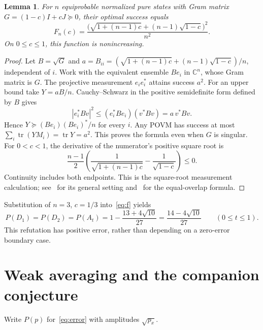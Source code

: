 \documentclass[11pt]{article}
\newtheorem{lemma}[theorem]{Lemma}
\newcommand{\tr}{\operatorname{tr}}
\begin{document}
\begin{lemma}\label{lem:symmetric}
For $n$ equiprobable normalized pure states with Gram matrix
$G=(1-c)I+cJ\succeq0$, their optimal success equals
\begin{equation}\label{eq:f}
 F_n(c)=\frac{\bigl(\sqrt{1+(n-1)c}+(n-1)\sqrt{1-c}\bigr)^2}{n^2}.
\end{equation}
On $0\leq c\leq1$, this function is nonincreasing.
\end{lemma}
\begin{proof}
Let $B=\sqrt G$ and
$a=B_{ii}=(\sqrt{1+(n-1)c}+(n-1)\sqrt{1-c})/n$,
independent of $i$. Work with the equivalent ensemble $B e_i$ in
$\mathbb C^n$, whose Gram matrix is $G$. The projective measurement
$e_i e_i^*$ attains success $a^2$. For an upper bound take
$Y=aB/n$. Cauchy--Schwarz in the positive semidefinite form defined by
$B$ gives
\[
 |e_i^*Bv|^2\leq(e_i^*Be_i)(v^*Bv)=a\,v^*Bv.
\]
Hence $Y\succeq (Be_i)(Be_i)^*/n$ for every $i$. Any POVM has success
at most $\sum_i\tr(YM_i)=\tr Y=a^2$. This proves the formula even
when $G$ is singular. For $0<c<1$, the derivative of the numerator's
positive square root is
\[
 \frac{n-1}{2}\left(\frac1{\sqrt{1+(n-1)c}}
                         -\frac1{\sqrt{1-c}}\right)\leq0.
\]
Continuity includes both endpoints. This is the square-root measurement
calculation; see~\cite{EF} for its general setting and~\cite[Lemma 2]{ZGH}
for the equal-overlap formula.
\end{proof}

Substitution of $n=3$, $c=1/3$ into~\eqref{eq:f} yields
\begin{equation}\label{eq:exact}
 P(D_1)=P(D_2)=P(A_t)=1-\frac{13+4\sqrt{10}}{27}
 =\frac{14-4\sqrt{10}}{27}\qquad(0\leq t\leq1).
\end{equation}
This refutation has positive error, rather than depending on a zero-error
boundary case.

\section{Weak averaging and the companion conjecture}
Write $P(p)$ for~\eqref{eq:error} with amplitudes $\sqrt{p_x}$.
\end{document}
